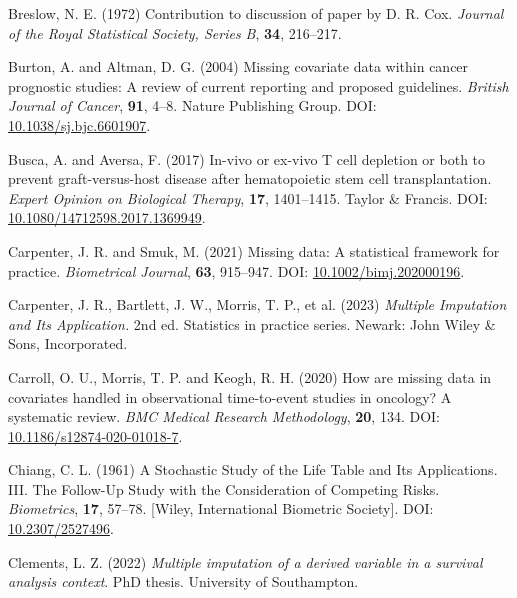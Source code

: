 \documentclass[
  letterpaper,
  paper=240mm:170mm,
  twoside=true,
  open=right,
  fontsize=10pt,
  pagesize=false,
  BCOR=15mm,
  DIV=14,
  headinclude=true,
  footinclude=false,
  headsepline=on]{scrbook}
\newlength{\cslhangindent}
\newenvironment{CSLReferences}[2] %
 {\begin{list}{}{%
  \setlength{\itemindent}{0pt}
  \setlength{\leftmargin}{0pt}
  \setlength{\parsep}{0pt}
  \ifodd #1
   \setlength{\leftmargin}{\cslhangindent}
   \setlength{\itemindent}{-1\cslhangindent}
  \fi
  \setlength{\itemsep}{#2\baselineskip}}}
 {\end{list}}
\begin{document}
\begin{CSLReferences}{1}{1}
Breslow, N. E. (1972) Contribution to discussion of paper by {D}. {R}.
{Cox}. \emph{Journal of the Royal Statistical Society, Series B},
\textbf{34}, 216--217.

Burton, A. and Altman, D. G. (2004) Missing covariate data within cancer
prognostic studies: A review of current reporting and proposed
guidelines. \emph{British Journal of Cancer}, \textbf{91}, 4--8. Nature
Publishing Group. DOI:
\href{https://doi.org/10.1038/sj.bjc.6601907}{10.1038/sj.bjc.6601907}.

Busca, A. and Aversa, F. (2017) In-vivo or ex-vivo {T} cell depletion or
both to prevent graft-versus-host disease after hematopoietic stem cell
transplantation. \emph{Expert Opinion on Biological Therapy},
\textbf{17}, 1401--1415. Taylor \& Francis. DOI:
\href{https://doi.org/10.1080/14712598.2017.1369949}{10.1080/14712598.2017.1369949}.

Carpenter, J. R. and Smuk, M. (2021) Missing data: {A} statistical
framework for practice. \emph{Biometrical Journal}, \textbf{63},
915--947. DOI:
\href{https://doi.org/10.1002/bimj.202000196}{10.1002/bimj.202000196}.

Carpenter, J. R., Bartlett, J. W., Morris, T. P., et al. (2023)
\emph{Multiple Imputation and Its Application.} 2nd ed. Statistics in
practice series. Newark: John Wiley \& Sons, Incorporated.

Carroll, O. U., Morris, T. P. and Keogh, R. H. (2020) How are missing
data in covariates handled in observational time-to-event studies in
oncology? {A} systematic review. \emph{BMC Medical Research
Methodology}, \textbf{20}, 134. DOI:
\href{https://doi.org/10.1186/s12874-020-01018-7}{10.1186/s12874-020-01018-7}.

Chiang, C. L. (1961) A {Stochastic Study} of the {Life Table} and {Its
Applications}. {III}. {The Follow-Up Study} with the {Consideration} of
{Competing Risks}. \emph{Biometrics}, \textbf{17}, 57--78. {[}Wiley,
International Biometric Society{]}. DOI:
\href{https://doi.org/10.2307/2527496}{10.2307/2527496}.

Clements, L. Z. (2022) \emph{Multiple imputation of a derived variable
in a survival analysis context}. PhD thesis. University of Southampton.


\end{CSLReferences}
\end{document}
